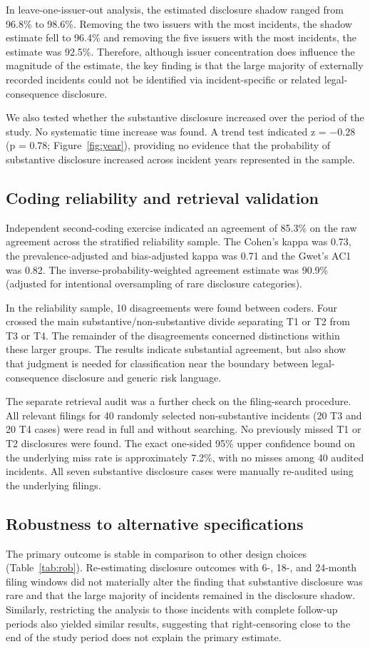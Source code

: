 \documentclass[utf8]{FrontiersinHarvard}
\begin{document}
In leave-one-issuer-out analysis, the estimated disclosure shadow ranged from 96.8\% to 98.6\%. Removing the two issuers with the most incidents, the shadow estimate fell to 96.4\% and removing the five issuers with the most incidents, the estimate was 92.5\%. Therefore, although issuer concentration does influence the magnitude of the estimate, the key finding is that the large majority of externally recorded incidents could not be identified via incident-specific or related legal-consequence disclosure.

We also tested whether the substantive disclosure increased over the period of the study. No systematic time increase was found. A trend test indicated z = $-0.28$ (p = 0.78; Figure~\ref{fig:year}), providing no evidence that the probability of substantive disclosure increased across incident years represented in the sample.

\subsection{Coding reliability and retrieval validation}
Independent second-coding exercise indicated an agreement of 85.3\% on the raw agreement across the stratified reliability sample. The Cohen's kappa was 0.73, the prevalence-adjusted and bias-adjusted kappa was 0.71 and the Gwet's AC1 was 0.82. The inverse-probability-weighted agreement estimate was 90.9\% (adjusted for intentional oversampling of rare disclosure categories).

In the reliability sample, 10 disagreements were found between coders. Four crossed the main substantive/non-substantive divide separating T1 or T2 from T3 or T4. The remainder of the disagreements concerned distinctions within these larger groups. The results indicate substantial agreement, but also show that judgment is needed for classification near the boundary between legal-consequence disclosure and generic risk language.

The separate retrieval audit was a further check on the filing-search procedure. All relevant filings for 40 randomly selected non-substantive incidents (20 T3 and 20 T4 cases) were read in full and without searching. No previously missed T1 or T2 disclosures were found. The exact one-sided 95\% upper confidence bound on the underlying miss rate is approximately 7.2\%, with no misses among 40 audited incidents. All seven substantive disclosure cases were manually re-audited using the underlying filings.

\subsection{Robustness to alternative specifications}
The primary outcome is stable in comparison to other design choices (Table~\ref{tab:rob}). Re-estimating disclosure outcomes with 6-, 18-, and 24-month filing windows did not materially alter the finding that substantive disclosure was rare and that the large majority of incidents remained in the disclosure shadow. Similarly, restricting the analysis to those incidents with complete follow-up periods also yielded similar results, suggesting that right-censoring close to the end of the study period does not explain the primary estimate.
\end{document}
